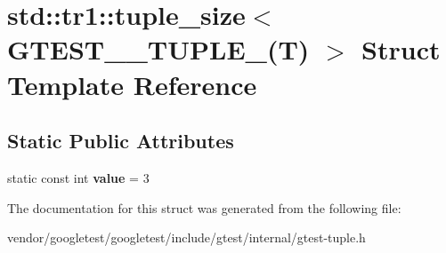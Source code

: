 \hypertarget{structstd_1_1tr1_1_1tuple__size_3_01GTEST__3__TUPLE___07T_08_01_4}{}\section{std\+:\+:tr1\+:\+:tuple\+\_\+size$<$ G\+T\+E\+S\+T\+\_\+\_\+\+T\+U\+P\+L\+E\+\_\+(T) $>$ Struct Template Reference}
\label{structstd_1_1tr1_1_1tuple__size_3_01GTEST__3__TUPLE___07T_08_01_4}
\subsection*{Static Public Attributes}
\begin{DoxyCompactItemize}
\item 
static const int {\bfseries value} = 3\hypertarget{structstd_1_1tr1_1_1tuple__size_3_01GTEST__3__TUPLE___07T_08_01_4_ac1e2e7bb87bad1d33e4373b3e1af37c3}{}\label{structstd_1_1tr1_1_1tuple__size_3_01GTEST__3__TUPLE___07T_08_01_4_ac1e2e7bb87bad1d33e4373b3e1af37c3}

\end{DoxyCompactItemize}


The documentation for this struct was generated from the following file\+:\begin{DoxyCompactItemize}
\item 
vendor/googletest/googletest/include/gtest/internal/gtest-\/tuple.\+h\end{DoxyCompactItemize}

